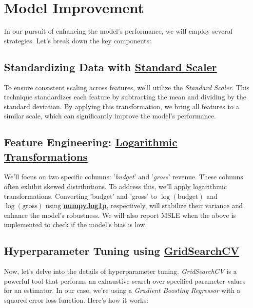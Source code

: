 \documentclass[conference]{IEEEtran}
\begin{document}
\section{Model Improvement}
    In our pursuit of enhancing the model's performance, we will employ several strategies. Let's break down the key components:

    \subsection{Standardizing Data with \href{https://scikit-learn.org/stable/modules/generated/sklearn.preprocessing.StandardScaler.html}{Standard Scaler}}

        To ensure consistent scaling across features, we'll utilize the \textit{Standard Scaler}. This technique standardizes each feature by subtracting the mean and dividing by the standard deviation. By applying this transformation, we bring all features to a similar scale, which can significantly improve the model's performance.

    \subsection{Feature Engineering: \href{https://numpy.org/doc/stable/reference/generated/numpy.log1p.html}{Logarithmic Transformations}}

        We'll focus on two specific columns: '\textit{budget}' and '\textit{gross}' revenue. These columns often exhibit skewed distributions. To address this, we'll apply logarithmic transformations. Converting 'budget' and 'gross' to \(\log(\text{budget})\) and \(\log(\text{gross})\) using \href{https://numpy.org/doc/stable/reference/generated/numpy.log1p.html}{\textbf{numpy.log1p}}, respectively, will stabilize their variance and enhance the model's robustness. We will also report MSLE when the above is implemented to check if the model's bias is low.

    \subsection{Hyperparameter Tuning using \href{https://scikit-learn.org/stable/modules/generated/sklearn.model_selection.GridSearchCV.html}{GridSearchCV}}

    Now, let's delve into the details of hyperparameter tuning. \textit{GridSearchCV} is a powerful tool that performs an exhaustive search over specified parameter values for an estimator. In our case, we're using a \textit{Gradient Boosting Regressor} with a squared error loss function. Here's how it works:
\end{document}
